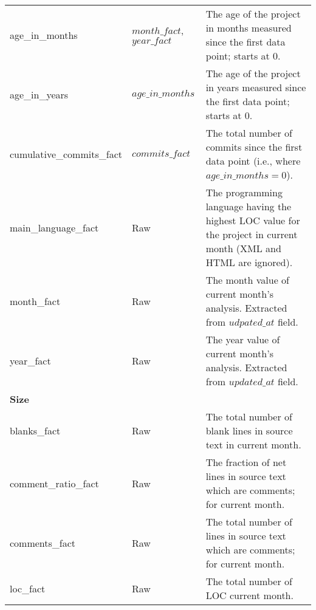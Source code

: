 \begin{table}
\begin{tabular}{p{4cm} p{3cm} p{7.5cm}}
		age\_in\_months & $month\_fact$, $year\_fact$ & The age of the project in
		months measured since the first data point; starts at 0. \\

		age\_in\_years & $age\_in\_months$ & The age of the project in years measured
		since the first data point; starts at 0. \\

		cumulative\_commits\_fact & $commits\_fact$ & The total number of commits
		since the first data point (i.e., where $age\_in\_months = 0$). \\

		main\_language\_fact & Raw & The programming language having the highest LOC
		value for the project in current month (XML and HTML are ignored). \\

		month\_fact & Raw & The month value of current month's analysis. Extracted from
		$udpated\_at$ field. \\

		year\_fact & Raw & The year value of current month's analysis. Extracted from
		$updated\_at$ field. \\
		\hline
		
		\bfseries{Size}\rm \\ \hline

		blanks\_fact & Raw & The total number of blank lines in source text in current
		month. \\

		comment\_ratio\_fact & Raw & The fraction of net lines in source text which
		are comments; for current month. \\

		comments\_fact & Raw & The total number of lines in source text which are
		comments; for current month. \\

		loc\_fact & Raw & The total number of LOC current month. \\

		\hline
	\end{tabular}
\end{table}